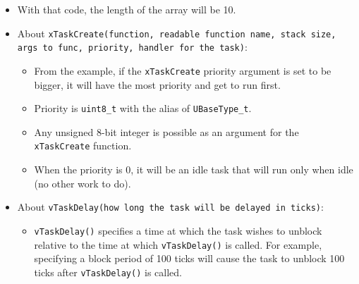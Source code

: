 \documentclass{article}
\begin{document}
\begin{itemize}
    \item With that code, the length of the array will be 10.

    \item About \texttt{xTaskCreate(function, readable function name, stack size, args to func, priority, handler for the task)}:
    \begin{itemize}
        \item From the example, if the \texttt{xTaskCreate} priority argument is set to be bigger, it will have the most priority and get to run first.
        \item Priority is \texttt{uint8\_t} with the alias of \texttt{UBaseType\_t}.
        \item Any unsigned 8-bit integer is possible as an argument for the \texttt{xTaskCreate} function.
        \item When the priority is 0, it will be an idle task that will run only when idle (no other work to do).
    \end{itemize}

    \item About \texttt{vTaskDelay(how long the task will be delayed in ticks)}:
    \begin{itemize}
        \item \texttt{vTaskDelay()} specifies a time at which the task wishes to unblock relative to the time at which \texttt{vTaskDelay()} is called. For example, specifying a block period of 100 ticks will cause the task to unblock 100 ticks after \texttt{vTaskDelay()} is called.
    \end{itemize}

\end{itemize}
\end{document}
